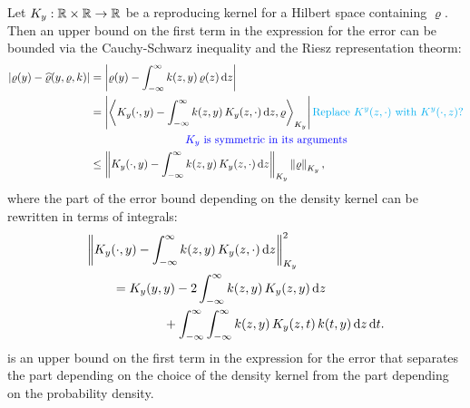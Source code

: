 \documentclass[letterpaper]{amsart}
\newcommand{\hvarrho}{\widehat{\varrho}}
\newcommand{\KY}{K_y}
\newcommand{\AGSNote}[1]{{\color{cyan} #1}}
\newcommand{\FJHNote}[1]{{\color{blue} #1}}
\begin{document}
Let $\KY:\reals \times \reals \to \reals$ be a reproducing kernel for a Hilbert space containing $\varrho$.  Then an upper bound on the first term in the expression for the error can be bounded via the Cauchy-Schwarz inequality and the Riesz representation theorm:
\begin{align}
\label{eq:firstbd}
\abs{\varrho(y) - \hvarrho(y,\varrho,k)}
& = \abs{\varrho(y) - \int_{-\infty}^{\infty} k(z,y) \, \varrho(z) \, \dif z} \\
\nonumber
& = \abs{\ip[\KY]{\KY(\cdot,y) - \int_{-\infty}^{\infty} k(z,y) \, \KY(z,\cdot) \,  \dif z}{\varrho} } \AGSNote{\text{Replace } K^y(z,\cdot) \text{ with } K^y(\cdot,z) \text{?}} \\
& \nonumber \hspace{20ex} \FJHNote{\KY \text{ is symmetric in its arguments}}\\
\nonumber
& \le  \norm[\KY]{\KY(\cdot,y) - \int_{-\infty}^{\infty} k(z,y) \, \KY(z,\cdot) \, \dif z} \norm[\KY]{\varrho},
\end{align}
where the part of the error bound depending on the density kernel can be rewritten in terms of integrals:
\begin{align}
\label{eq:kquality}
\MoveEqLeft{\norm[\KY]{\KY(\cdot,y) - \int_{-\infty}^{\infty} k(z,y) \, \KY(z,\cdot) \, \dif z}^2} \\ \nonumber
&=  \KY(y,y) - 2 \int_{-\infty}^{\infty} k(z,y) \, \KY(z,y) \, \dif z \\ \nonumber
& \qquad \qquad + \int_{-\infty}^{\infty} \int_{-\infty}^{\infty}  k(z,y) \, \KY(z,t) \, k(t,y)\, \dif z \, \dif t.
\end{align}
 is an upper bound on the first term in the expression for the error that separates the part depending on the choice of the density kernel from the part depending on the probability density.
\end{document}
